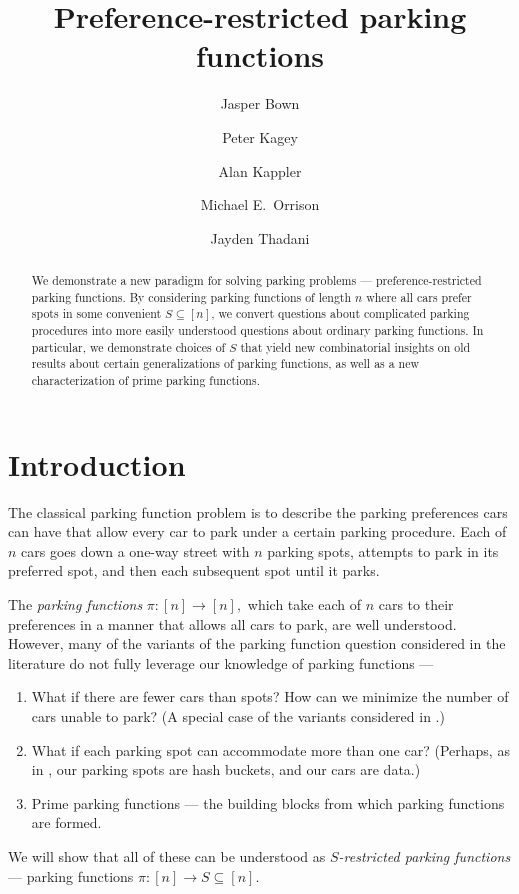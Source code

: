 \documentclass[12 pt]{amsart}
\title{Preference-restricted parking functions}
\author[Bown]{Jasper Bown}
\author[Kagey]{Peter Kagey}
\author[Kappler]{Alan Kappler}
\author[Orrison]{Michael E.~Orrison}
\author[Thadani]{Jayden Thadani}
\theoremstyle{definition} %
\theoremstyle{remark} %
\begin{document}
	

\begin{abstract}
	We demonstrate a new paradigm for solving parking problems --- preference-restricted parking functions. By considering parking functions of length $n$ where all cars prefer spots in some convenient $S \subseteq [n]$, we convert questions about complicated parking procedures into more easily understood questions about ordinary parking functions. In particular, we demonstrate choices of $S$ that yield new combinatorial insights on old results about certain generalizations of parking functions, as well as a new characterization of prime parking functions.
\end{abstract}

\maketitle

\section{Introduction}

The classical parking function problem is to describe the parking preferences cars can have that allow every car to park under a certain parking procedure. Each of $n$ cars goes down a one-way street with $n$ parking spots, attempts to park in its preferred spot, and then each subsequent spot until it parks.

The \emph{parking functions} $\pi : [n] \to [n],$ which take each of $n$ cars to their preferences in a manner that allows all cars to park, are well understood. However, many of the variants of the parking function question considered in the literature do not fully leverage our knowledge of parking functions ---
\begin{enumerate}
	\item What if there are fewer cars than spots? How can we minimize the number of cars unable to park? (A special case of the variants considered in \cite{cameron-johannsen-prellberg-schweitzer-2008}.)
	\item What if each parking spot can accommodate more than one car? (Perhaps, as in \cite{blake-konheim-1977}, our parking spots are hash buckets, and our cars are data.)
	\item Prime parking functions --- the building blocks from which parking functions are formed.
\end{enumerate}
We will show that all of these can be understood as \emph{$S$-restricted parking functions} --- parking functions $\pi : [n] \to S \subseteq [n]$. 
\end{document}
